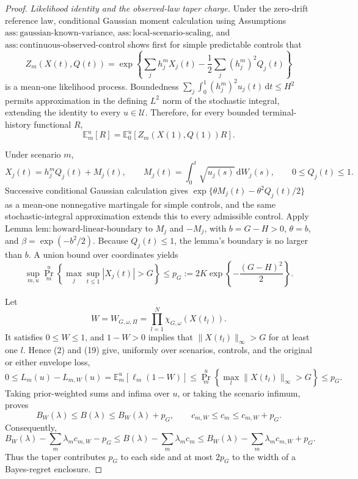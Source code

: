 \documentclass{article}
\begin{document}
\begin{proof}
\emph{Likelihood identity and the observed-law taper charge.}
Under the zero-drift reference law, conditional Gaussian moment calculation using Assumptions \(\mathrm{ass{:}gaussian\text{-}known\text{-}variance}\), \(\mathrm{ass{:}local\text{-}scenario\text{-}scaling}\), and \(\mathrm{ass{:}continuous\text{-}observed\text{-}control}\) shows first for simple predictable controls that
\[
 Z_m(X(t),Q(t))=
 \exp\!\left\{\sum_jh_j^mX_j(t)-\frac12\sum_j(h_j^m)^2Q_j(t)\right\}
 \tag{16}
\]
is a mean-one likelihood process.  Boundedness
\(\sum_j\int_0^1(h_j^m)^2u_j(t)\,\mathrm dt\leq H^2\) permits approximation in the defining \(L^2\) norm of the stochastic integral, extending the identity to every \(u\in\mathcal U\).  Therefore, for every bounded terminal-history functional \(R\),
\[
 \mathbb E_m^u[R]=\mathbb E_0^u[Z_m(X(1),Q(1))R].
 \tag{17}
\]

Under scenario \(m\),
\[
 X_j(t)=h_j^mQ_j(t)+M_j(t),
 \qquad
 M_j(t)=\int_0^t\sqrt{u_j(s)}\,\mathrm dW_j(s),
 \qquad 0\leq Q_j(t)\leq1.
 \tag{18}
\]
Successive conditional Gaussian calculation gives
\(\exp\{\theta M_j(t)-\theta^2Q_j(t)/2\}\) as a mean-one nonnegative martingale for simple controls, and the same stochastic-integral approximation extends this to every admissible control.  Apply Lemma \(\mathrm{lem{:}howard\text{-}linear\text{-}boundary}\) to \(M_j\) and \(-M_j\), with \(b=G-H>0\), \(\theta=b\), and \(\beta=\exp(-b^2/2)\).  Because \(Q_j(t)\leq1\), the lemma's boundary is no larger than \(b\).  A union bound over coordinates yields
\[
 \sup_{m,u}\Pr_m^u\!\left\{\max_j\sup_{t\leq1}|X_j(t)|>G\right\}
 \leq p_G:=2K\exp\!\left\{-\frac{(G-H)^2}{2}\right\}.
 \tag{19}
\]

Let
\[
 W=W_{G,\omega,\Pi}=\prod_{l=1}^N\chi_{G,\omega}(X(t_l)).
 \tag{20}
\]
It satisfies \(0\leq W\leq1\), and \(1-W>0\) implies that \(\|X(t_l)\|_\infty>G\) for at least one \(l\).  Hence (2) and (19) give, uniformly over scenarios, controls, and the original or either envelope loss,
\[
 0\leq L_m(u)-L_{m,W}(u)
 =\mathbb E_m^u[\ell_m(1-W)]
 \leq\Pr_m^u\!\left\{\max_l\|X(t_l)\|_\infty>G\right\}
 \leq p_G.
 \tag{21}
\]
Taking prior-weighted sums and infima over \(u\), or taking the scenario infimum, proves
\[
 B_W(\lambda)\leq B(\lambda)\leq B_W(\lambda)+p_G,
 \qquad
 c_{m,W}\leq c_m\leq c_{m,W}+p_G.
 \tag{22}
\]
Consequently,
\[
 B_W(\lambda)-\sum_m\lambda_mc_{m,W}-p_G
 \leq B(\lambda)-\sum_m\lambda_mc_m
 \leq B_W(\lambda)-\sum_m\lambda_mc_{m,W}+p_G.
 \tag{23}
\]
Thus the taper contributes \(p_G\) to each side and at most \(2p_G\) to the width of a Bayes-regret enclosure.


\end{proof}
\end{document}

